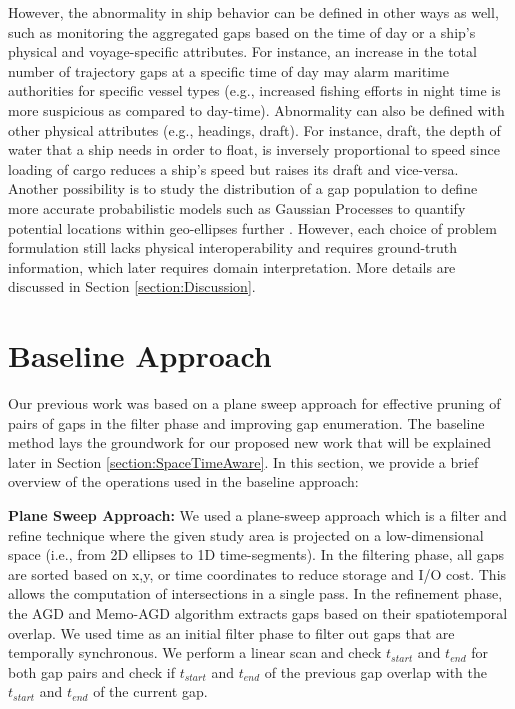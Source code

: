 \documentclass[acmsmall]{acmart}
\begin{document}
However, the abnormality in ship behavior can be defined in other ways as well, such as monitoring the aggregated gaps based on the time of day or a ship’s physical and voyage-specific attributes. For instance, an increase in the total number of trajectory gaps at a specific time of day may alarm maritime authorities for specific vessel types (e.g., increased fishing efforts in night time is more suspicious as compared to day-time). Abnormality can also be defined with other physical attributes (e.g., headings, draft). For instance, draft, the depth of water that a ship needs in order to float, is inversely proportional to speed since loading of cargo reduces a ship’s speed but raises its draft and vice-versa. Another possibility is to study the distribution of a gap population to define more accurate probabilistic models such as Gaussian Processes to quantify potential locations within geo-ellipses further \cite{miller1991modelling}. However, each choice of problem formulation still lacks physical interoperability and requires ground-truth information, which later requires domain interpretation. More details are discussed in Section \ref{section:Discussion}.

\section{Baseline Approach}
\label{section:baseline}
Our previous work \cite{sharma2022abnormal} was based on a plane sweep approach for effective pruning of pairs of gaps in the filter phase and improving gap enumeration. The baseline method lays the groundwork for our proposed new work that will be explained later in Section \ref{section:SpaceTimeAware}. In this section, we provide a brief overview of the operations used in the baseline approach:


\textbf{Plane Sweep Approach:} We used a plane-sweep approach which is a filter and refine technique \cite{sharma2022analyzing} where the given study area is projected on a low-dimensional space (i.e., from 2D ellipses to 1D time-segments). In the filtering phase, all gaps are sorted based on x,y, or time coordinates to reduce storage and I/O cost. This allows the computation of intersections in a single pass. In the refinement phase, the AGD and Memo-AGD algorithm \cite{sharma2022abnormal} extracts gaps based on their spatiotemporal overlap. We used time as an initial filter phase to filter out gaps that are temporally synchronous. We perform a linear scan and check $t_{start}$ and $t_{end}$ for both gap pairs and check if $t_{start}$ and $t_{end}$ of the previous gap overlap with the $t_{start}$ and $t_{end}$ of the current gap.
\end{document}
